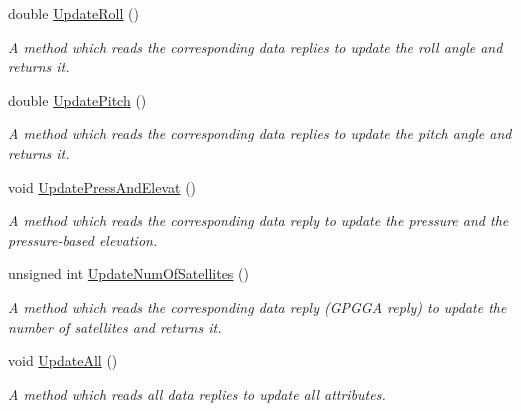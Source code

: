 \begin{DoxyCompactItemize}
\mbox{\label{classGPSInterface_a1ecdea88151717981ee50935aab30b90}} 
double \hyperlink{classGPSInterface_a1ecdea88151717981ee50935aab30b90}{Update\+Roll} ()
\begin{DoxyCompactList}\small\item\em A method which reads the corresponding data replies to update the roll angle and returns it. \end{DoxyCompactList}\item 
\mbox{\label{classGPSInterface_adf915f785dec180e91766fb3900542c0}} 
double \hyperlink{classGPSInterface_adf915f785dec180e91766fb3900542c0}{Update\+Pitch} ()
\begin{DoxyCompactList}\small\item\em A method which reads the corresponding data replies to update the pitch angle and returns it. \end{DoxyCompactList}\item 
\mbox{\label{classGPSInterface_a756ac8b2cbe6d206089f8e5be7bc844a}} 
void \hyperlink{classGPSInterface_a756ac8b2cbe6d206089f8e5be7bc844a}{Update\+Press\+And\+Elevat} ()
\begin{DoxyCompactList}\small\item\em A method which reads the corresponding data reply to update the pressure and the pressure-\/based elevation. \end{DoxyCompactList}\item 
\mbox{\label{classGPSInterface_a602aac740af9b1a98a977572be09a657}} 
unsigned int \hyperlink{classGPSInterface_a602aac740af9b1a98a977572be09a657}{Update\+Num\+Of\+Satellites} ()
\begin{DoxyCompactList}\small\item\em A method which reads the corresponding data reply (G\+P\+G\+GA reply) to update the number of satellites and returns it. \end{DoxyCompactList}\item 
\mbox{\label{classGPSInterface_a4feebd6ac12f24ff93fea932e5272ae8}} 
void \hyperlink{classGPSInterface_a4feebd6ac12f24ff93fea932e5272ae8}{Update\+All} ()
\begin{DoxyCompactList}\small\item\em A method which reads all data replies to update all attributes. \end{DoxyCompactList}\item 

\end{DoxyCompactItemize}

